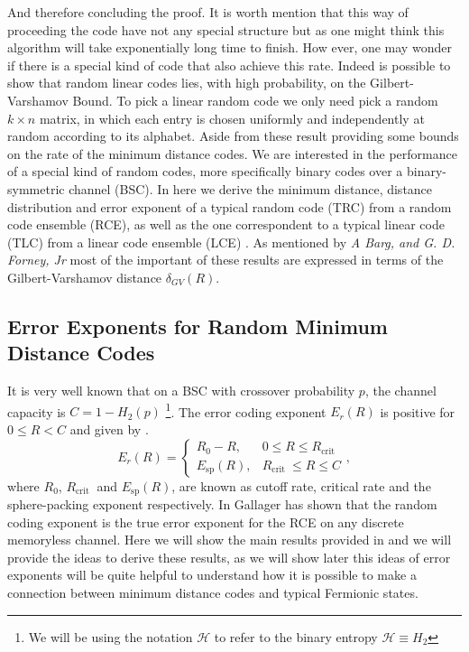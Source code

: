 And therefore concluding the proof. It is worth mention that this way of proceeding the code have not any special structure but as one might think this algorithm will take exponentially long time to finish. How ever, one may wonder if there is a special kind of code that also achieve this rate. Indeed is possible to show that random linear codes lies, with high probability, on the Gilbert-Varshamov Bound. To pick a linear random code we only need pick a random $k\times n $ matrix, in which each entry is chosen uniformly and independently at random according to its alphabet\cite{mackay_information_2003,jaynes_probability_2003}. Aside from these result providing some bounds on the rate of the minimum distance codes. We are interested in the performance of a special kind of random codes, more specifically binary codes over a binary-symmetric channel (BSC). In here we derive the minimum distance, distance distribution and error exponent of a typical random code (TRC) from a random code ensemble (RCE), as well as the one correspondent to a typical linear code (TLC) from a linear code ensemble (LCE) \cite{barg_random_2002}. As mentioned by \textit{A Barg, and G. D. Forney, Jr} most of the important of these results are expressed in terms of the Gilbert-Varshamov distance  $\delta_{GV}(R)$.
\subsection{Error Exponents for Random Minimum Distance Codes}
It is very well known that on a BSC with crossover probability $p$, the channel capacity is $C=1-H_2(p)$ \footnote{We will be using the notation $\mathcal{H}$ to refer to the binary entropy $\mathcal{H}\equiv H_2$ }. The error coding exponent $E_r(R)$ is positive for $0\leq R < C$ and given by \cite{gallager_low-density_1962,gallager_information_1968}.
\begin{equation}
E_{r}(R)=\left\{\begin{array}{ll}
R_{0}-R, & 0 \leq R \leq R_{\text {crit }} \\
E_{\mathrm{sp}}(R), & R_{\text {crit }} \leq R \leq C
\end{array}\right.,
\end{equation}
where $R_0$,  $R_{\text {crit }}$ and $E_{\mathrm{sp}}(R)$, are known as cutoff rate, critical rate and the sphere-packing exponent respectively. In \cite{gallager_random_2006} Gallager has shown that the random coding exponent is the true error exponent for the RCE   on any discrete memoryless channel. Here we will show the main results provided in \cite{barg_random_2002} and we will provide the ideas to derive these results, as we will show later this ideas of error exponents will be quite helpful to understand how it is possible to make a connection between minimum distance codes and typical Fermionic  states.
